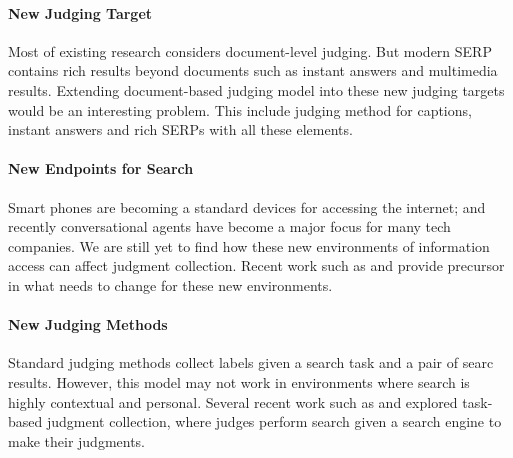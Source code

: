 \paragraph{New Judging Target} Most of existing research considers document-level judging. But modern SERP contains rich results beyond documents such as instant answers and multimedia results. Extending document-based judging model into these new judging targets would be an interesting problem. This include judging method for captions, instant answers and rich SERPs with all these elements.

\paragraph{New Endpoints for Search} Smart phones are becoming a standard devices for accessing the internet; and recently conversational agents have become a major focus for many tech companies. We are still yet to find how these new environments of information access can affect judgment collection. Recent work such as \cite{VermaY16} and \cite{Kiseleva:2016} provide precursor in what needs to change for these new environments.

\paragraph{New Judging Methods} Standard judging methods collect labels given a search task and a pair of searc results. However, this model may not work in environments where search is highly contextual and personal. Several recent work such as  \cite{Moraveji:2011} and \cite{Xu:2009} explored task-based judgment collection, where judges perform search given a search engine to make their judgments.
